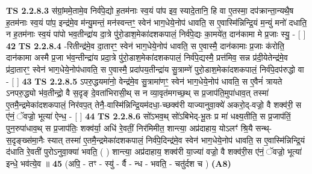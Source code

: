 \documentclass[17pt]{extarticle}
\begin{document}
                  \newline
                                \textbf{ TS 2.2.8.3} \newline
                  स॑ग्रां॒ममे॒तामे॒व निर्व॑पे॒द्यो ह॒तम॑नाः स्व॒यं पा॑प इव॒ स्यादे॒तानि॒ हि वा ए॒तस्मा॒ दप॑क्रान्ता॒न्यथै॒ष ह॒तम॑नाः स्व॒यं पा॑प॒ इन्द्र॑मे॒व म॑न्यु॒मन्तं॒ मन॑स्वन्तꣳ॒॒ स्वेन॑ भाग॒धेये॒नोप॑ धावति॒ स ए॒वास्मि॑न्निन्द्रि॒यं म॒न्युं मनो॑ दधाति॒ न ह॒तम॑नाः स्व॒यं पा॑पो भव॒तीन्द्रा॑य दा॒त्रे पु॑रो॒डाश॒मेका॑दशकपालं॒ निर्व॑पे॒द्यः का॒मये॑त॒ दान॑कामा मे प्र॒जाः स्यु॒ - [  ] \textbf{  42} \newline
                  \newline
                                \textbf{ TS 2.2.8.4} \newline
                  -रितीन्द्र॑मे॒व दा॒तारꣳ॒॒ स्वेन॑ भाग॒धेये॒नोप॑ धावति॒ स ए॒वास्मै॒ दान॑कामाः प्र॒जाः क॑रोति॒ दान॑कामा अस्मै प्र॒जा भ॑व॒न्तीन्द्रा॑य प्रदा॒त्रे पु॑रो॒डाश॒मेका॑दशकपालं॒ निर्व॑पे॒द्यस्मै॒ प्रत्त॑मिव॒ सन्न प्र॑दी॒येतेन्द्र॑मे॒व प्र॑दा॒तारꣳ॒॒ स्वेन॑ भाग॒धेये॒नोप॑धावति॒ स ए॒वास्मै॒ प्रदा॑पय॒तीन्द्रा॑य सु॒त्राम्णे॑ पुरो॒डाश॒मेका॑दशकपालं॒ निर्व॑पे॒दप॑रुद्धो वा - [  ] \textbf{  43} \newline
                  \newline
                                \textbf{ TS 2.2.8.5} \newline
                  ऽपरु॒द्धयमा॑नो॒ वेन्द्र॑मे॒व सु॒त्रामा॑णꣳ॒॒ स्वेन॑ भाग॒धेये॒नोप॑ धावति॒ स ए॒वैनं॑ त्रायते ऽनपरु॒द्ध्यो भ॑व॒तीन्द्रो॒ वै स॒दृङ् दे॒वता॑भिरासी॒थ् स न व्या॒वृत॑मगच्छ॒थ् स प्र॒जाप॑ति॒मुपा॑धाव॒त् तस्मा॑ ए॒तमै॒न्द्रमेका॑दशकपालं॒ निर॑वप॒त् तेनै॒-वास्मि॑न्निन्द्रि॒यम॑दधा॒-च्छक्व॑री याज्यानुवा॒क्ये॑ अकरो॒द्-वज्रो॒ वै शक्व॑री॒ स ए॑नं॒ ॅवज्रो॒ भूत्या॑ ऐन्ध॒ - [  ] \textbf{  44} \newline
                  \newline
                                \textbf{ TS 2.2.8.6} \newline
                  सो॑ऽभव॒थ् सो॑ऽबिभेद्-भू॒तः प्र मा॑ धक्ष्य॒तीति॒ स प्र॒जाप॑तिं॒ पुन॒रुपा॑धाव॒थ् स प्र॒जाप॑तिः॒ शक्व॑र्या॒ अधि॑ रे॒वतीं॒ निर॑मिमीत॒ शान्त्या॒ अप्र॑दाहाय॒ योऽलꣳ॑ श्रि॒यै सन्थ्-स॒दृङ्ख्स॑मा॒नैः स्यात् तस्मा॑ ए॒तमै॒न्द्रमेका॑दशकपालं॒ निर्व॑पे॒दिन्द्र॑मे॒व स्वेन॑ भाग॒धेये॒नोप॑ धावति॒ स ए॒वास्मि॑न्निन्द्रि॒यं द॑धाति रे॒वती॑ पुरोऽनुवा॒क्या॑ भवति॒ ( ) शान्त्या॒ अप्र॑दाहाय॒ शक्व॑री या॒ज्या॑ वज्रो॒ वै शक्व॑री॒स ए॑नं॒ ॅवज्रो॒ भूत्या॑ इन्धे॒ भव॑त्ये॒व ॥ \textbf{  45 } \newline
                  \newline
                      (अपि॒ - तꣳ - स्यु॑ - र्वै - न्ध - भवति॒ - चतु॑र्दश च )  \textbf{(A8)} \newline \newline
\end{document}
